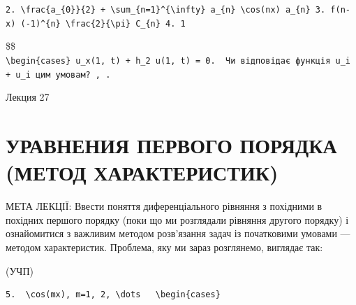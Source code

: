 \documentclass[
  ukrainian,
]{article}
\begin{document}
\texttt{2.\ \textquotesingle{}\textbackslash{}frac\{a\_\{0\}\}\{2\}\ +\ \textbackslash{}sum\_\{n=1\}\^{}\{\textbackslash{}infty\}\ a\_\{n\}\ \textbackslash{}cos(nx)\textquotesingle{}\ \textquotesingle{}a\_\{n\}\textquotesingle{}\ 3.\ \textquotesingle{}f(n-x)\textquotesingle{}\ \textquotesingle{}(-1)\^{}\{n\}\ \textbackslash{}frac\{2\}\{\textbackslash{}pi\}\ C\_\{n\}\textquotesingle{}\ 4.\ 1}

\$\$
\texttt{\textbackslash{}begin\{cases\}\ u\_x(1,\ t)\ +\ h\_2\ u(1,\ t)\ =\ 0.\ \ Чи\ відповідає\ функція\ u\_i\ +\ u\_i\ цим\ умовам?\ ,\ .}

Лекция 27

\section{УРАВНЕНИЯ ПЕРВОГО ПОРЯДКА (МЕТОД
ХАРАКТЕРИСТИК)}\label{ux443ux440ux430ux432ux43dux435ux43dux438ux44f-ux43fux435ux440ux432ux43eux433ux43e-ux43fux43eux440ux44fux434ux43aux430-ux43cux435ux442ux43eux434-ux445ux430ux440ux430ux43aux442ux435ux440ux438ux441ux442ux438ux43a}

МЕТА ЛЕКЦІЇ: Ввести поняття диференціального рівняння з похідними в
похідних першого порядку (поки що ми розглядали рівняння другого
порядку) і ознайомитися з важливим методом розв'язання задач із
початковими умовами --- методом характеристик. Проблема, яку ми зараз
розглянемо, виглядає так:

(УЧП)

\begin{verbatim}
5.  \cos(mx), m=1, 2, \dots   \begin{cases}
\end{verbatim}
\end{document}
